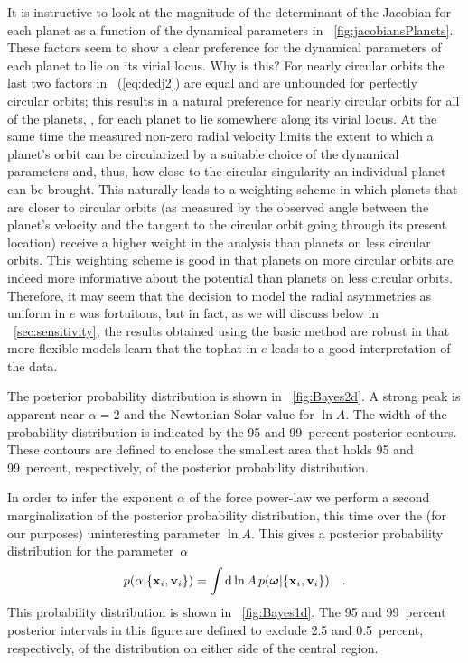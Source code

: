It is instructive to look at the magnitude of the determinant of the
Jacobian for each planet as a function of the dynamical parameters in
\figurename~\ref{fig:jacobiansPlanets}. These factors seem to show a
clear preference for the dynamical parameters of each planet to lie on
its virial locus. Why is this? For nearly circular orbits the last two
factors in \eqnname~(\ref{eq:dedj2}) are equal and are unbounded for
perfectly circular orbits; this results in a natural preference for
nearly circular orbits for all of the planets, \ie, for each planet to
lie somewhere along its virial locus. At the same time the measured
non-zero radial velocity limits the extent to which a planet's orbit
can be circularized by a suitable choice of the dynamical parameters
and, thus, how close to the circular singularity an individual planet
can be brought. This naturally leads to a weighting scheme in which
planets that are closer to circular orbits (as measured by the
observed angle between the planet's velocity and the tangent to the
circular orbit going through its present location) receive a higher
weight in the analysis than planets on less circular orbits. This
weighting scheme is good in that planets on more circular orbits are
indeed more informative about the potential than planets on less
circular orbits. Therefore, it may seem that the decision to model the
radial asymmetries as uniform in $e$ was fortuitous, but in fact, as
we will discuss below in \sectionname~\ref{sec:sensitivity}, the
results obtained using the basic method are robust in that more
flexible models learn that the tophat in $e$ leads to a good
interpretation of the data.

The posterior probability distribution is shown in
\figurename~\ref{fig:Bayes2d}. A strong peak is apparent near $\alpha
= 2$ and the Newtonian Solar value for $\ln A$.  The width of the
probability distribution is indicated by the 95 and 99~percent
posterior contours. These contours are defined to enclose the
smallest area that holds 95 and 99~percent, respectively, of the
posterior probability distribution.

In order to infer the exponent $\alpha$ of the force power-law we
perform a second marginalization of the posterior probability
distribution, this time over the (for our purposes) uninteresting
parameter $\ln A$. This gives a posterior probability distribution for
the parameter~$\alpha$
\begin{equation}
p(\alpha|\{\boldsymbol{\mathbf{x}}_i,\boldsymbol{\mathbf{v}}_i\}) = \int \mathrm{d} \ln A\, p(\boldsymbol{{\omega}}|\{\boldsymbol{\mathbf{x}}_i,\boldsymbol{\mathbf{v}}_i\}) \quad.
\end{equation}
This probability distribution is shown in
\figurename~\ref{fig:Bayes1d}. The 95 and 99~percent posterior
intervals in this figure are defined to exclude 2.5 and 0.5~percent,
respectively, of the distribution on either side of the central
region.

